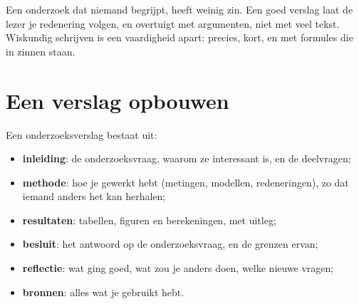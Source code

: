 %



Een onderzoek dat niemand begrijpt, heeft weinig zin. Een goed verslag laat de lezer je redenering volgen, en overtuigt met argumenten, niet met veel tekst. Wiskundig schrijven is een vaardigheid apart: precies, kort, en met formules die in zinnen staan.

\begin{oefeningen}[Start]

\end{oefeningen}

\section{Een verslag opbouwen}

\begin{theorie}
Een onderzoeksverslag bestaat uit:
\begin{itemize}
\item \textbf{\textcolor{accent}{inleiding}}: de onderzoeksvraag, waarom ze interessant is, en de deelvragen;
\item \textbf{\textcolor{accent}{methode}}: hoe je gewerkt hebt (metingen, modellen, redeneringen), zo dat iemand anders het kan herhalen;
\item \textbf{\textcolor{accent}{resultaten}}: tabellen, figuren en berekeningen, met uitleg;
\item \textbf{\textcolor{accent}{besluit}}: het antwoord op de onderzoeksvraag, en de grenzen ervan;
\item \textbf{\textcolor{accent}{reflectie}}: wat ging goed, wat zou je anders doen, welke nieuwe vragen;
\item \textbf{\textcolor{accent}{bronnen}}: alles wat je gebruikt hebt.
\end{itemize}
\end{theorie}

